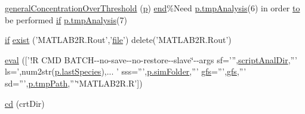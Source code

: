 \begin{DoxyCompactItemize}
\item 
\hyperlink{a00032_a56bd5c817530f9b305b5375d6509978a}{general\+Concentration\+Over\+Threshold} (\hyperlink{a00028_aa2b4c35904308d35fc5d606a429e608d}{p}) \hyperlink{a00025_afb358f48b1646c750fb9da6c6585be2b}{end}\%Need \hyperlink{a00032_a98ae4bf3f5f573af6ea4fc18d2a1125e}{p.\+tmp\+Analysis}(6) in order \hyperlink{a00028_af71dbe52628a3f83a77ab494817525c6}{to} be performed \hyperlink{a00030_a01d55766b8058903dd360b4bda71f9f5}{if} \hyperlink{a00032_a98ae4bf3f5f573af6ea4fc18d2a1125e}{p.\+tmp\+Analysis}(7)
\item 
\hyperlink{a00030_a01d55766b8058903dd360b4bda71f9f5}{if} \hyperlink{a00032_ab41b8dc78dee42a1a5e5a33d8bf6eeb3}{exist} ('M\+A\+T\+L\+A\+B2\+R.\+Rout','\hyperlink{a00110_a4e8353d6c62cf54bf4a1a8f63e56b8c3}{file}') delete('M\+A\+T\+L\+A\+B2\+R.\+Rout')
\item 
\hyperlink{a00032_ab4c95c2d6a84263412f5679a78b55e41}{eval} (\mbox{[}'!R C\+M\+D B\+A\+T\+C\+H-\/-\/no-\/save-\/-\/no-\/restore-\/-\/slave\char`\"{}-\/-\/args sf=''',\hyperlink{a00032_a2a07fff00b80967a40ae67d91fd31cb4}{script\+Anal\+Dir},''' ls=',num2str(\hyperlink{a00032_aad7be196243f3c9ca83dfee7c9111014}{p.\+last\+Species}),...
        ' sss=''',\hyperlink{a00032_aa671e3345005bd599e662bcaa115b18a}{p.\+sim\+Folder},''' \hyperlink{a00032_a5714ee99d309183e59b051e92e5a44d1}{gfs}=''',\hyperlink{a00032_a5714ee99d309183e59b051e92e5a44d1}{gfs},''' sd=''',\hyperlink{a00032_a1e5a4863ab2b87f923e1d19e2da1f5ac}{p.\+tmp\+Path},'''\char`\"{}M\+A\+T\+L\+A\+B2\+R.\+R'\mbox{]})
\item 
\hyperlink{a00032_a2160a514930abbfa9436b787b4cfc8ab}{cd} (crt\+Dir)
\end{DoxyCompactItemize}
